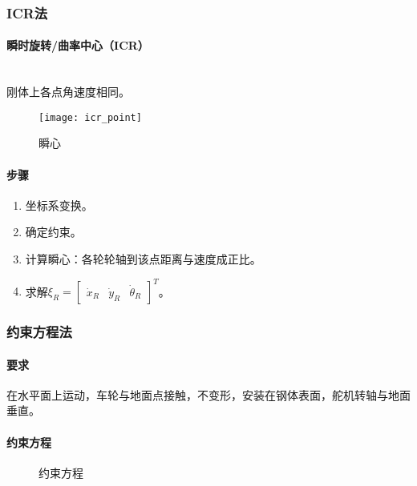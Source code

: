 \documentclass[
12pt, %
a4paper, 
oneside, %
headinclude,footinclude, %
]{scrartcl}
\begin{document}
\subsubsection[ICR法]{ICR法}
\noindent
\begin{minipage}{0.3\textwidth}
\paragraph{瞬时旋转/曲率中心（ICR）}~\\
刚体上各点角速度相同。
\begin{figure}[H]
\centering 
\texttt{[image: icr\_point]} 
\caption{瞬心}
\end{figure}
\end{minipage}
\begin{minipage}{0.7\textwidth}
\paragraph{步骤}
\begin{enumerate}
\item 坐标系变换。
\item 确定约束。
\item 计算瞬心：各轮轮轴到该点距离与速度成正比。
\item 求解$ \xi_R = \begin{bmatrix} \dot{x}_R & \dot{y}_R & \dot{\theta}_R \end{bmatrix}^T $。
\end{enumerate}
\end{minipage}
\subsubsection[约束方程法]{约束方程法}
\paragraph{要求}
在水平面上运动，车轮与地面点接触，不变形，安装在钢体表面，舵机转轴与地面垂直。
\paragraph{约束方程}
\begin{figure}[H]
\centering
{} \quad
{} \quad
{}
\caption{约束方程}
\end{figure}
\end{document}
